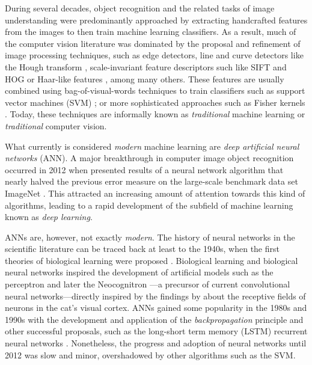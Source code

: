 {During several decades, object recognition and the related tasks of image understanding were predominantly approached by extracting handcrafted features from the images to then train machine learning classifiers. As a result, much of the computer vision literature was dominated by the proposal and refinement of image processing techniques, such as edge detectors, line and curve detectors like the Hough transform \citep{duda1972hough}, scale-invariant feature descriptors such like SIFT \citep{lowe2004sift} and HOG \citep{dalal2005hog} or Haar-like features \citep{lienhart2002haar}, among many others. These features are usually combined using bag-of-visual-words techniques \citep{sivic2003bog} to train classifiers such as support vector machines (SVM) \citep{cortes1995svm}; or more sophisticated approaches such as Fisher kernels \citep{perronnin2007fisher}. Today, these techniques are informally known as \textit{traditional} machine learning or \textit{traditional} computer vision.

What currently is considered \textit{modern} machine learning are \textit{deep artificial neural networks} (ANN). A major breakthrough in computer image object recognition occurred in 2012 when \citet{krizhevsky2012alexnet} presented results of a neural network algorithm that nearly halved the previous error measure on the large-scale benchmark data set ImageNet \citep{russakovsky2015imagenet}. This attracted an increasing amount of attention towards this kind of algorithms, leading to a rapid development of the subfield of machine learning known as \textit{deep learning}.

ANNs are, however, not exactly \textit{modern}. The history of neural networks in the scientific literature can be traced back at least to the 1940s, when the first theories of biological learning were proposed \citep{mcculloch1943biologicallearning, hebb1949biologicallearning}. Biological learning and biological neural networks inspired the development of artificial models such as the perceptron \citep{rosenblatt1958perceptron} and later the Neocognitron \citep{fukushima1982neocognitron}---a precursor of current convolutional neural networks---directly inspired by the findings by \citet{hubelwiesel1959} about the receptive fields of neurons in the cat's visual cortex. ANNs gained some popularity in the 1980s and 1990s with the development and application of the \textit{backpropagation} principle \citep{rumelhart1986backprop} and other successful proposals, such as the long-short term memory (LSTM) recurrent neural networks \citep{hochreiter1997lstm}. Nonetheless, the progress and adoption of neural networks until 2012 was slow and minor, overshadowed by other algorithms such as the SVM.

}
